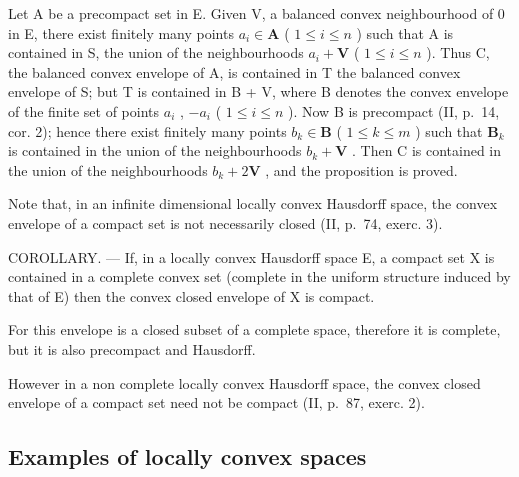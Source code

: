 Let A be a precompact set in E. Given V, a balanced convex neighbourhood of 0 in E, there exist finitely many points \(a_i \in \mathbf{A}\) ( \(1 \leqslant i \leqslant n\) ) such that A is contained in S, the union of the neighbourhoods \(a_i + \mathbf{V}\) ( \(1 \leqslant i \leqslant n\) ). Thus C, the balanced convex envelope of A, is contained in T the balanced convex envelope of S; but T is contained in B + V, where B denotes the convex envelope of the finite set of points \(a_i\) , \(-a_i\) ( \(1 \leqslant i \leqslant n\) ). Now B is precompact (II, p.~14, cor. 2); hence there exist finitely many points \(b_k \in \mathbf{B}\) ( \(1 \leqslant k \leqslant m\) ) such that \(\mathbf{B}_k\) is contained in the union of the neighbourhoods \(b_k + \mathbf{V}\) . Then C is contained in the union of the neighbourhoods \(b_k + 2\mathbf{V}\) , and the proposition is proved.

Note that, in an infinite dimensional locally convex Hausdorff space, the convex envelope of a compact set is not necessarily closed (II, p.~74, exerc. 3).

COROLLARY. --- If, in a locally convex Hausdorff space E, a compact set X is contained in a complete convex set (complete in the uniform structure induced by that of E) then the convex closed envelope of X is compact.

For this envelope is a closed subset of a complete space, therefore it is complete, but it is also precompact and Hausdorff.

However in a non complete locally convex Hausdorff space, the convex closed envelope of a compact set need not be compact (II, p.~87, exerc. 2).

\subsection{Examples of locally convex spaces}

